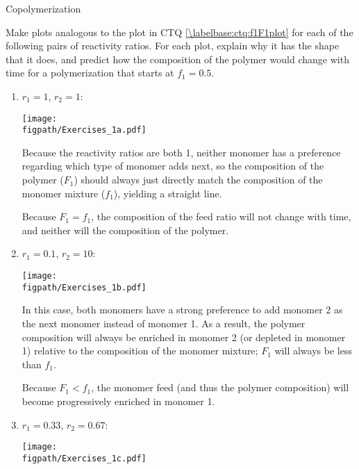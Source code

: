 \begin{activity}{Copolymerization}
\begin{exercises}

	\exercise Make plots analogous to the plot in CTQ \ref{\labelbase:ctq:f1F1plot} for each of the following pairs of reactivity ratios.  For each plot, explain why it has the shape that it does, and predict how the composition of the polymer would change with time for a polymerization that starts at $f_1=0.5$.
	
		\begin{enumerate}
			\item $r_1=1$, $r_2=1$:
	
				\begin{solution}{}
					\centerline{\texttt{[image: \\figpath/Exercises\_1a.pdf]}}
				
					Because the reactivity ratios are both 1, neither monomer has a preference regarding which type of monomer adds next, so the composition of the polymer ($F_1$) should always just directly match the composition of the monomer mixture ($f_1$), yielding a straight line.
					
					Because $F_1=f_1$, the composition of the feed ratio will not change with time, and neither will the composition of the polymer.
		
				\end{solution}		

			\item $r_1=0.1$, $r_2=10$:
			
				\begin{solution}{}
	
					\centerline{\texttt{[image: \\figpath/Exercises\_1b.pdf]}}
				
					In this case, both monomers have a strong preference to add monomer 2 as the next monomer instead of monomer 1.  As a result, the polymer composition will always be enriched in monomer 2 (or depleted in monomer 1) relative to the composition of the monomer mixture; $F_1$ will always be less than $f_1$.
					
					Because $F_1<f_1$, the monomer feed (and thus the polymer composition) will become progressively enriched in monomer 1.
					
				\end{solution}
				
				
			\item $r_1=0.33$, $r_2=0.67$:
	
				\begin{solution}{}
					\centerline{\texttt{[image: \\figpath/Exercises\_1c.pdf]}}
					

\end{solution}
\end{enumerate}
\end{exercises}
\end{activity}
